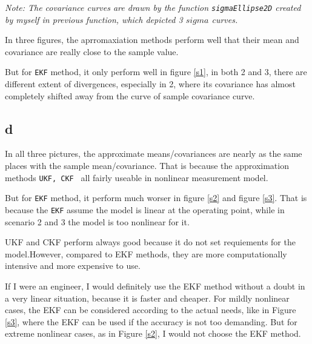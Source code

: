 \emph{Note: The covariance curves are drawn by the function \texttt{sigmaEllipse2D} created by myself in previous function, which depicted 3 $ sigma $ curves.}

In three figures, the aprromaxiation methods perform well that their mean and covariance are really close to the sample value.

But for \texttt{EKF} method, it only perform well in figure \ref{s1}, in both 2 and 3, there are different extent of divergences, especially in 2, where its covariance has almost completely shifted away from the curve of sample covariance curve.

\subsection{d}

In all three pictures, the approximate means/covariances are nearly as the same places with the sample mean/covariance. That is because the approximation methods \texttt{UKF, CKF } all fairly useable in nonlinear measurement model.

But for \texttt{EKF} method, it perform much worser in figure \ref{s2} and figure \ref{s3}. That is because the \texttt{EKF} assume the model is linear at the operating point, while in scenario 2 and 3 the model is too nonlinear for it.

UKF and CKF perform always good because it do not set requiements for the model.However, compared to EKF methods, they are more computationally intensive and more expensive to use.

If I were an engineer, I would definitely use the EKF method without a doubt in a very linear situation, because it is faster and cheaper. For mildly nonlinear cases, the EKF can be considered according to the actual needs, like in Figure \ref{s3}, where the EKF can be used if the accuracy is not too demanding. But for extreme nonlinear cases, as in Figure \ref{s2}, I would not choose the EKF method.